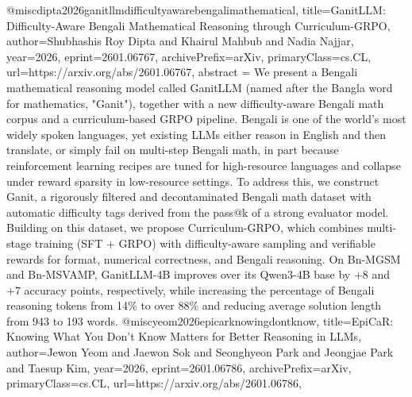 {}@misc{dipta2026ganitllmdifficultyawarebengalimathematical,
      title={GanitLLM: Difficulty-Aware Bengali Mathematical Reasoning through Curriculum-GRPO}, 
      author={Shubhashis Roy Dipta and Khairul Mahbub and Nadia Najjar},
      year={2026},
      eprint={2601.06767},
      archivePrefix={arXiv},
      primaryClass={cs.CL},
      url={https://arxiv.org/abs/2601.06767},
      abstract = {We present a Bengali mathematical reasoning model called GanitLLM (named after the Bangla word for mathematics, "Ganit"), together with a new difficulty-aware Bengali math corpus and a curriculum-based GRPO pipeline. Bengali is one of the world's most widely spoken languages, yet existing LLMs either reason in English and then translate, or simply fail on multi-step Bengali math, in part because reinforcement learning recipes are tuned for high-resource languages and collapse under reward sparsity in low-resource settings. To address this, we construct Ganit, a rigorously filtered and decontaminated Bengali math dataset with automatic difficulty tags derived from the pass@k of a strong evaluator model. Building on this dataset, we propose Curriculum-GRPO, which combines multi-stage training (SFT + GRPO) with difficulty-aware sampling and verifiable rewards for format, numerical correctness, and Bengali reasoning. On Bn-MGSM and Bn-MSVAMP, GanitLLM-4B improves over its Qwen3-4B base by +8 and +7 accuracy points, respectively, while increasing the percentage of Bengali reasoning tokens from 14\% to over 88\% and reducing average solution length from 943 to 193 words.}
}@misc{yeom2026epicarknowingdontknow,
      title={EpiCaR: Knowing What You Don't Know Matters for Better Reasoning in LLMs}, 
      author={Jewon Yeom and Jaewon Sok and Seonghyeon Park and Jeongjae Park and Taesup Kim},
      year={2026},
      eprint={2601.06786},
      archivePrefix={arXiv},
      primaryClass={cs.CL},
      url={https://arxiv.org/abs/2601.06786},
}
